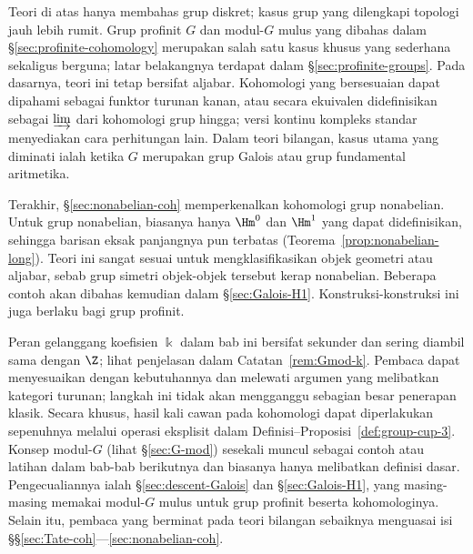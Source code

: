 Teori di atas hanya membahas grup diskret; kasus grup yang dilengkapi topologi
jauh lebih rumit. Grup profinit $G$ dan modul-$G$ mulus yang dibahas dalam
\S\ref{sec:profinite-cohomology} merupakan salah satu kasus khusus yang
sederhana sekaligus berguna; latar belakangnya terdapat dalam
\S\ref{sec:profinite-groups}. Pada dasarnya, teori ini tetap bersifat aljabar.
Kohomologi yang bersesuaian dapat dipahami sebagai funktor
turunan kanan, atau secara ekuivalen didefinisikan sebagai $\varinjlim$ dari
kohomologi grup hingga; versi kontinu kompleks standar menyediakan cara
perhitungan lain. Dalam teori bilangan, kasus utama yang diminati ialah ketika
$G$ merupakan grup Galois atau grup fundamental aritmetika.

Terakhir, \S\ref{sec:nonabelian-coh} memperkenalkan kohomologi grup nonabelian.
Untuk grup nonabelian, biasanya hanya $\Hm^0$ dan $\Hm^1$ yang dapat
didefinisikan, sehingga barisan eksak panjangnya pun terbatas
(Teorema~\ref{prop:nonabelian-long}). Teori ini sangat sesuai untuk
mengklasifikasikan objek geometri atau aljabar, sebab grup simetri objek-objek
tersebut kerap nonabelian. Beberapa contoh akan dibahas kemudian dalam
\S\ref{sec:Galois-H1}. Konstruksi-konstruksi ini juga berlaku bagi grup
profinit.

\begin{petunjukbacaan}
	Peran gelanggang koefisien $\Bbbk$ dalam bab ini bersifat sekunder dan sering
	diambil sama dengan $\Z$; lihat penjelasan dalam
	Catatan~\ref{rem:Gmod-k}. Pembaca dapat menyesuaikan dengan kebutuhannya dan
	melewati argumen yang melibatkan kategori turunan; langkah ini tidak akan
	mengganggu sebagian besar penerapan klasik. Secara khusus, hasil kali cawan
	pada kohomologi dapat diperlakukan sepenuhnya melalui operasi eksplisit
	dalam Definisi--Proposisi~\ref{def:group-cup-3}. Konsep modul-$G$ (lihat
	\S\ref{sec:G-mod}) sesekali muncul sebagai contoh atau latihan dalam bab-bab
	berikutnya dan biasanya hanya melibatkan definisi dasar. Pengecualiannya
	ialah \S\ref{sec:descent-Galois} dan \S\ref{sec:Galois-H1}, yang masing-masing
	memakai modul-$G$ mulus untuk grup profinit beserta kohomologinya. Selain itu,
	pembaca yang berminat pada teori bilangan sebaiknya menguasai isi
	\S\S\ref{sec:Tate-coh}---\ref{sec:nonabelian-coh}.
\end{petunjukbacaan}

